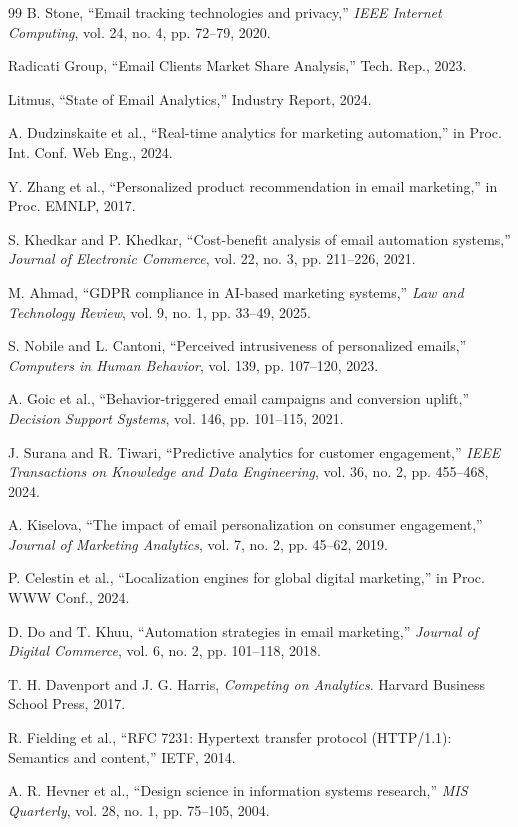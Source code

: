 \documentclass[12pt,journal,compsoc]{IEEEtran}
\begin{document}
\begin{thebibliography}{99}
 B. Stone, ``Email tracking technologies and privacy,'' \textit{IEEE Internet Computing}, vol. 24, no. 4, pp. 72--79, 2020.

 Radicati Group, ``Email Clients Market Share Analysis,'' Tech. Rep., 2023.

 Litmus, ``State of Email Analytics,'' Industry Report, 2024.

 A. Dudzinskaite et al., ``Real-time analytics for marketing automation,'' in Proc. Int. Conf. Web Eng., 2024.

 Y. Zhang et al., ``Personalized product recommendation in email marketing,'' in Proc. EMNLP, 2017.

 S. Khedkar and P. Khedkar, ``Cost-benefit analysis of email automation systems,'' \textit{Journal of Electronic Commerce}, vol. 22, no. 3, pp. 211--226, 2021.

 M. Ahmad, ``GDPR compliance in AI-based marketing systems,'' \textit{Law and Technology Review}, vol. 9, no. 1, pp. 33--49, 2025.

 S. Nobile and L. Cantoni, ``Perceived intrusiveness of personalized emails,'' \textit{Computers in Human Behavior}, vol. 139, pp. 107--120, 2023.

 A. Goic et al., ``Behavior-triggered email campaigns and conversion uplift,'' \textit{Decision Support Systems}, vol. 146, pp. 101--115, 2021.

 J. Surana and R. Tiwari, ``Predictive analytics for customer engagement,'' \textit{IEEE Transactions on Knowledge and Data Engineering}, vol. 36, no. 2, pp. 455--468, 2024.

 A. Kiselova, ``The impact of email personalization on consumer engagement,'' \textit{Journal of Marketing Analytics}, vol. 7, no. 2, pp. 45--62, 2019.

 P. Celestin et al., ``Localization engines for global digital marketing,'' in Proc. WWW Conf., 2024.

 D. Do and T. Khuu, ``Automation strategies in email marketing,'' \textit{Journal of Digital Commerce}, vol. 6, no. 2, pp. 101--118, 2018.

 T. H. Davenport and J. G. Harris, \textit{Competing on Analytics}. Harvard Business School Press, 2017.

 R. Fielding et al., ``RFC 7231: Hypertext transfer protocol (HTTP/1.1): Semantics and content,'' IETF, 2014.

 A. R. Hevner et al., ``Design science in information systems research,'' \textit{MIS Quarterly}, vol. 28, no. 1, pp. 75--105, 2004.

\end{thebibliography}
\end{document}
